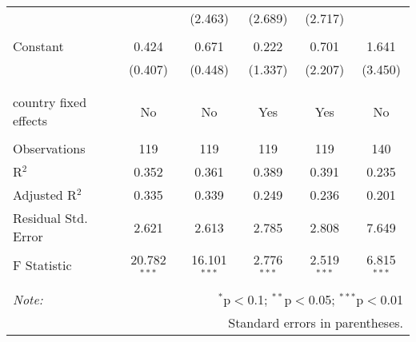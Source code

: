 \begin{tabular}{@{\extracolsep{5pt}}lccccc}
  &  & (2.463) & (2.689) & (2.717) &  \\ 
  & & & & & \\ 
 Constant & 0.424 & 0.671 & 0.222 & 0.701 & 1.641 \\ 
  & (0.407) & (0.448) & (1.337) & (2.207) & (3.450) \\ 
  & & & & & \\ 
\hline \\[-1.8ex] 
country fixed effects & No & No & Yes & Yes & No \\ 
\hline \\[-1.8ex] 
Observations & 119 & 119 & 119 & 119 & 140 \\ 
R$^{2}$ & 0.352 & 0.361 & 0.389 & 0.391 & 0.235 \\ 
Adjusted R$^{2}$ & 0.335 & 0.339 & 0.249 & 0.236 & 0.201 \\ 
Residual Std. Error & 2.621 & 2.613 & 2.785 & 2.808 & 7.649 \\ 
F Statistic & 20.782$^{***}$ & 16.101$^{***}$ & 2.776$^{***}$ & 2.519$^{***}$ & 6.815$^{***}$ \\ 
\hline 
\hline \\[-1.8ex] 
\textit{Note:}  & \multicolumn{5}{r}{$^{*}$p$<$0.1; $^{**}$p$<$0.05; $^{***}$p$<$0.01} \\ 
 & \multicolumn{5}{r}{Standard errors in parentheses.} \\ 
\end{tabular} 
\endgroup 
